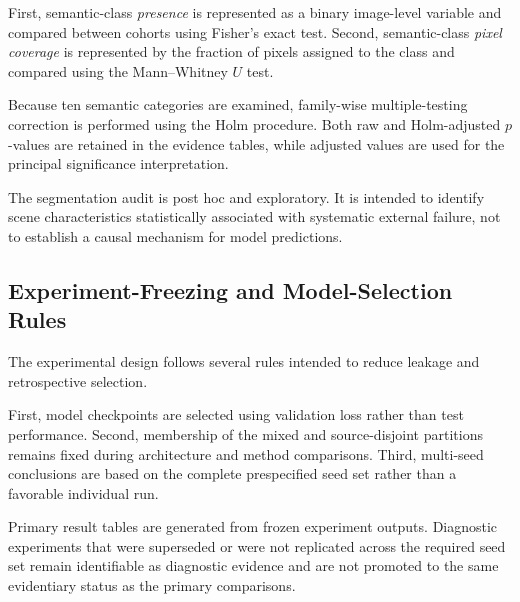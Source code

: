 First, semantic-class \emph{presence} is represented as a binary
image-level variable and compared between cohorts using Fisher's exact
test. Second, semantic-class \emph{pixel coverage} is represented by
the fraction of pixels assigned to the class and compared using the
Mann--Whitney \(U\) test.

Because ten semantic categories are examined, family-wise
multiple-testing correction is performed using the Holm procedure.
Both raw and Holm-adjusted \(p\)-values are retained in the evidence
tables, while adjusted values are used for the principal significance
interpretation.

The segmentation audit is post hoc and exploratory. It is intended to
identify scene characteristics statistically associated with systematic
external failure, not to establish a causal mechanism for model
predictions.

\subsection{Experiment-Freezing and Model-Selection Rules}

The experimental design follows several rules intended to reduce
leakage and retrospective selection.

First, model checkpoints are selected using validation loss rather than
test performance. Second, membership of the mixed and source-disjoint
partitions remains fixed during architecture and method comparisons.
Third, multi-seed conclusions are based on the complete prespecified
seed set rather than a favorable individual run.

Primary result tables are generated from frozen experiment outputs.
Diagnostic experiments that were superseded or were not replicated
across the required seed set remain identifiable as diagnostic
evidence and are not promoted to the same evidentiary status as the
primary comparisons.
